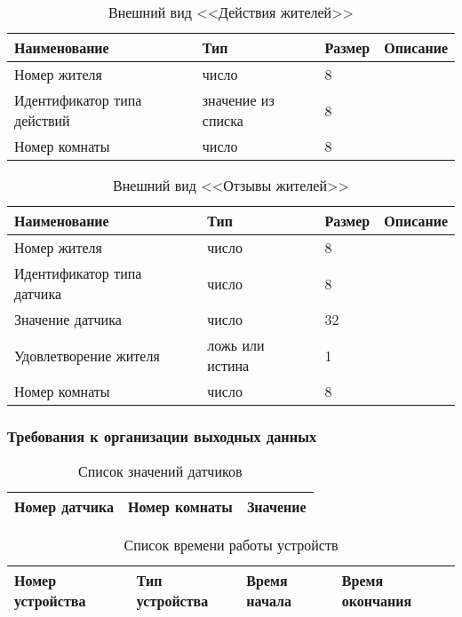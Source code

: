          \begin{table}[h!]
            \centering
            \caption{Внешний вид <<Действия жителей>>}
            \label{room:size}
            \begin{tabular}{|l|l|l|l|}
            \hline
            Наименование & Тип & Размер & Описание \\ \hline
            Номер жителя & число & 8 & \\ \hline
            Идентификатор типа действий & значение из списка & 8 & \\ \hline
            Номер комнаты & число & 8 & \\ \hline
            \end{tabular}
          \end{table}
          \begin{table}[h!]
            \centering
            \caption{Внешний вид <<Отзывы жителей>>}
            \label{room:size}
            \begin{tabular}{|l|l|l|l|}
            \hline
            Наименование & Тип & Размер & Описание \\ \hline
            Номер жителя & число & 8 & \\ \hline
            Идентификатор типа датчика & число & 8 & \\ \hline
            Значение датчика & число & 32 & \\ \hline
            Удовлетворение жителя & ложь или истина & 1 & \\ \hline
            Номер комнаты & число & 8 & \\ \hline
            \end{tabular}
          \end{table} 
    \subsubsection{Требования к организации выходных данных}
      \begin{table}[H]
      \centering
      \caption{Список значений датчиков}
      \label{sensor:statistic}
      \begin{tabular}{|l|l|l|}
      \hline
      Номер датчика & Номер комнаты & Значение \\ \hline
      \end{tabular}
      \end{table}
      
      \begin{table}[H]
      \centering
      \caption{Список времени работы устройств}
      \label{device:statistic}
      \begin{tabular}{|l|l|l|l|}
      \hline
      Номер устройства & Тип устройства & Время начала & Время окончания \\ \hline
      \end{tabular}
      \end{table}
